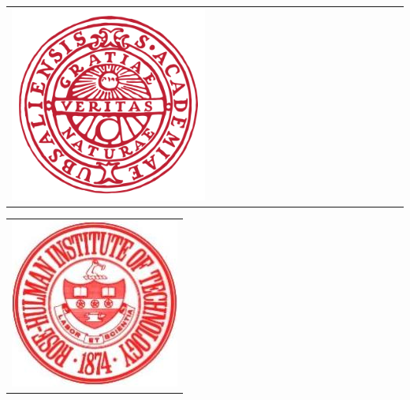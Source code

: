 
\begin{titlepage}

\begin{minipage}{4.0cm}
\begin{tabular}{l}
\includegraphics[width=0.5\textwidth]{Images/uppsala}
\end{tabular}
\end{minipage}
\hfill
\begin{minipage}{2.0cm}
\begin{tabular}{r}
\includegraphics[width=\textwidth]{Images/RHITseal}
\end{tabular}
\end{minipage}



\end{titlepage}
